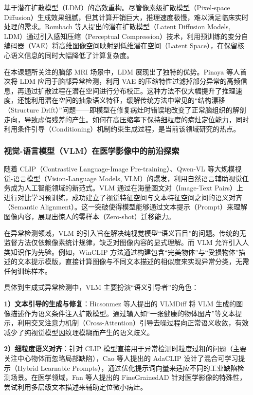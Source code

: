 \documentclass[Win]{xjtuBSThesis}  %
\begin{document}
基于潜在扩散模型（LDM）的高效重构。尽管像素级扩散模型（Pixel-space Diffusion）生成效果细腻，但其计算开销巨大，推理速度极慢，难以满足临床实时处理的需求。Rombach 等人提出的潜在扩散模型（Latent Diffusion Models, LDM）通过引入感知压缩（Perceptual Compression）技术，利用预训练的变分自编码器（VAE）将高维图像空间映射到低维潜在空间（Latent Space），在保留核心语义信息的同时大幅降低了计算复杂度。

在本课题所关注的脑部 MRI 场景中，LDM 展现出了独特的优势。Pinaya 等人首次将 LDM 应用于脑部异常检测，利用 VAE 的压缩特性过滤掉部分异常的高频信息，再通过扩散过程在潜在空间进行分布校正。这种方法不仅大幅提升了推理速度，还能利用潜在空间的抽象语义特征，缓解传统方法中常见的“结构漂移（Structure Drift）”问题——即模型在修复病灶时错误地改变了正常脑组织的解剖走向，导致虚假残差的产生。如何在高压缩率下保持细粒度的病灶定位能力，同时利用条件引导（Conditioning）机制约束生成过程，是当前该领域研究的热点。

\subsubsection{视觉-语言模型（VLM）在医学影像中的前沿探索}

随着 CLIP（Contrastive Language-Image Pre-training）、Qwen-VL 等大规模视觉-语言模型（Vision-Language Models, VLM）的爆发，利用自然语言辅助视觉任务成为人工智能领域的新范式。VLM 通过在海量图文对（Image-Text Pairs）上进行对比学习预训练，成功建立了视觉特征空间与文本特征空间之间的语义对齐（Semantic Alignment）。这一突破使得模型能够通过文本提示（Prompt）来理解图像内容，展现出惊人的零样本（Zero-shot）迁移能力。

在异常检测领域，VLM 的引入旨在解决纯视觉模型“语义盲目”的问题。传统的无监督方法仅依赖像素统计规律，缺乏对图像内容的显式理解。而 VLM 允许引入人类知识作为先验。例如，WinCLIP 方法通过构建包含“完美物体”与“受损物体”描述的文本提示模版，直接计算图像与不同文本描述的相似度来实现异常分类，无需任何训练样本。

具体到生成式异常检测中，VLM 主要扮演“语义引导者”的角色：

 \textbf{1）文本引导的生成与修复}：Hicsonmez 等人提出的 VLMDiff 将 VLM 生成的图像描述作为语义条件注入扩散模型。通过输入如“一张健康的物体图片”等文本提示，利用交叉注意力机制（Cross-Attention）引导去噪过程向正常语义收敛，有效减少了纯视觉模型因纹理模糊而产生的语义歧义。


\textbf{2）细粒度语义对齐}：针对 CLIP 模型直接用于异常检测时粒度过粗的问题（主要关注中心物体而忽略局部缺陷），Cao 等人提出的 AdaCLIP 设计了混合可学习提示（Hybrid Learnable Prompts），通过优化提示词向量来适应不同的工业缺陷检测场景。在医学领域，Fan 等人提出的 FineGrainedAD 针对医学影像的特殊性，尝试利用多层级文本描述来辅助定位微小病灶。
\end{document}

